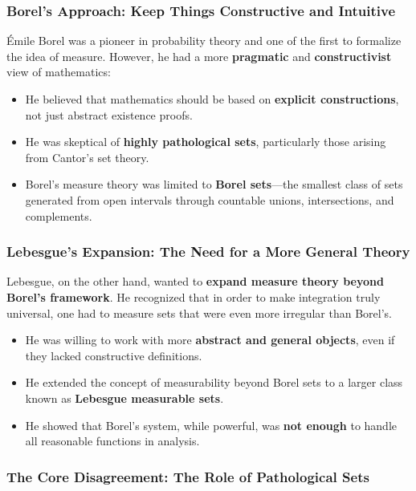 \subsubsection{Borel’s Approach: Keep Things Constructive and Intuitive}

Émile Borel was a pioneer in probability theory and one of the first to formalize the idea of measure. However, he had a more \textbf{pragmatic} and \textbf{constructivist} view of mathematics:

\begin{itemize}
    \item He believed that mathematics should be based on \textbf{explicit constructions}, not just abstract existence proofs.
    \item He was skeptical of \textbf{highly pathological sets}, particularly those arising from Cantor’s set theory.
    \item Borel’s measure theory was limited to \textbf{Borel sets}—the smallest class of sets generated from open intervals through countable unions, intersections, and complements.
\end{itemize}

\subsubsection{Lebesgue’s Expansion: The Need for a More General Theory}

Lebesgue, on the other hand, wanted to \textbf{expand measure theory beyond Borel’s framework}. He recognized that in order to make integration truly universal, one had to measure sets that were even more irregular than Borel’s.

\begin{itemize}
    \item He was willing to work with more \textbf{abstract and general objects}, even if they lacked constructive definitions.
    \item He extended the concept of measurability beyond Borel sets to a larger class known as \textbf{Lebesgue measurable sets}.
    \item He showed that Borel’s system, while powerful, was \textbf{not enough} to handle all reasonable functions in analysis.
\end{itemize}

\subsubsection{The Core Disagreement: The Role of Pathological Sets}

